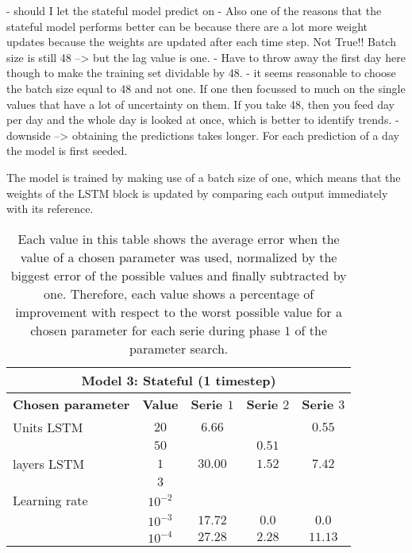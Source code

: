 - should I let the stateful model predict on 
- Also one of the reasons that the stateful model performs better can be because there are a lot more weight updates because the weights are updated after each time step. Not True!! Batch size is still 48 --> but the lag value is one.
- Have to throw away the first day here though to make the training set dividable by 48. 
- it seems reasonable to choose the batch size equal to 48 and not one. If one then focussed to much on the single values that have a lot of uncertainty on them. If you take 48, then you feed day per day and the whole day is looked at once, which is better to identify trends. 
- downside --> obtaining the predictions takes longer. For each prediction of a day the model is first seeded. 

The model is trained by making use of a batch size of one, which means that the weights of the LSTM block is updated by comparing each output immediately with its reference. 

\begin{table}[ht]
	\centering
	\begin{tabular}{@{}l||c|ccc@{}} \toprule
		\multicolumn{5}{c}{Model 3: Stateful (1 timestep)}\\\midrule\midrule
		\textbf{Chosen parameter}	& \textbf{Value} & \textbf{Serie $ 1 $} & \textbf{Serie $ 2 $} & \textbf{Serie $ 3 $}\\\midrule
		Units LSTM & $ 20 $ & $6.66 $		&  & $0.55 $\\
		& $ 50 $ & 		  		&	$ 0.51 $	   & 		\\\hline
		layers LSTM & $ 1 $ & $30.00 $		&	$ 1.52 $	   & 	$7.42$	\\
		& $ 3 $ & 	      		& 			 & \\\hline
		Learning rate & $ 10^{-2} $ &       &		   & 		\\
		& $  10^{-3} $ &$17.72 $&$0.0$  & $0.0$\\
		& $  10^{-4} $ &$27.28 $&$ 2.28$    & $11.13$\\\bottomrule
		
	\end{tabular}
	\caption{Each value in this table shows the average error when the value of a chosen parameter was used, normalized by the biggest error of the possible values and finally subtracted by one. Therefore, each value shows a percentage of improvement with respect to the worst possible value for a chosen parameter for each serie during phase $ 1 $ of the parameter search.}
	\label{tab:relative_performance_parameters_phase_one_model_three}
\end{table}

